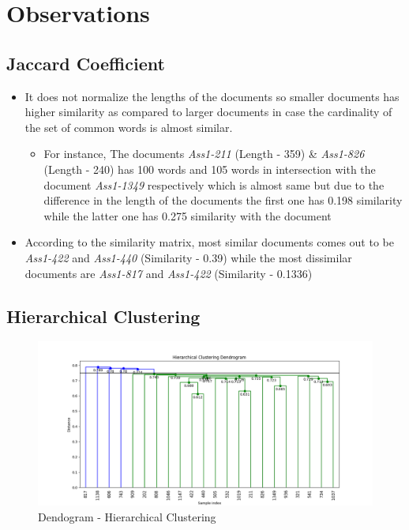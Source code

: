 \documentclass[7pt,a4paper]{article}
\begin{document}
\section{Observations}
\subsection{Jaccard Coefficient}
\begin{itemize}
\item{It does not normalize the lengths of the documents so smaller documents has higher similarity as compared to larger documents in case the cardinality of the set of common words is almost similar.}
\begin{itemize}
\item{For instance, The documents \textit{Ass1-211} (Length - 359) \& \textit{Ass1-826} (Length - 240) has 100 words and 105 words in intersection with the document \textit{Ass1-1349} respectively which is almost same but due to the difference in the length of the documents the first one has 0.198 similarity while the latter one has 0.275 similarity with the document}
\end{itemize}
\item{According to the similarity matrix, most similar documents comes out to be \textit{Ass1-422} and \textit{Ass1-440} (Similarity - 0.39) while the most dissimilar documents are \textit{Ass1-817} and \textit{Ass1-422} (Similarity - 0.1336)}
\end{itemize}

\subsection{Hierarchical Clustering}
\begin{figure}[h]
\centering
\includegraphics[scale=.35]{dendro}
\caption{Dendogram - Hierarchical Clustering}
\label{image-Dendogram}
\end{figure}
\end{document}
